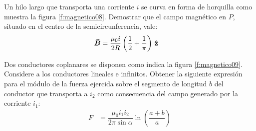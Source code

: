 %
\begin{Exercise}\label{p:magnetico08}
    Un hilo largo que transporta una corriente $i$ se curva en forma de horquilla como muestra la figura \ref{f:magnetico08}. Demostrar que el campo magnético en $P$, situado en el centro de la semicircunferencia, vale:
    \begin{align*}
        \va*{B} &= \dfrac{\mu_0 i}{2R} \left ( \dfrac{1}{2} + \dfrac{1}{\pi} \right ) \,\vu{z}
    \end{align*}
\end{Exercise}
%
\begin{center}
\end{center}
%
\begin{Exercise}\label{p:magnetico09}
    Dos conductores coplanares se disponen como indica la figura \ref{f:magnetico09}. Considere a los conductores lineales e infinitos. Obtener la siguiente expresión para el módulo de la fuerza ejercida sobre el segmento de longitud $b$ del conductor que transporta a $i_2$ como consecuencia del campo generado por la corriente $i_1$:
    \begin{align*}
        F &= \dfrac{\mu_0 i_1 i_2}{2\pi \sin\alpha} \ln \left ( \dfrac{a+b}{a}\right )
    \end{align*}
\end{Exercise}
%
